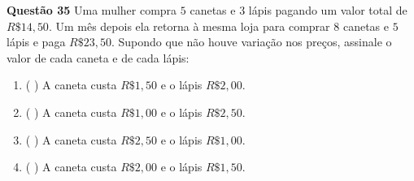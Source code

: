 {\bf Questão 35} 
Uma mulher compra $5$ canetas e $3$ lápis pagando um valor total de $R\$ 14,50$. Um mês depois ela retorna à
mesma loja para comprar $8$ canetas e $5$ lápis e paga $R\$ 23,50$. Supondo que não houve variação nos preços,
assinale o valor de cada caneta e de cada lápis:
\begin{enumerate}
		\item ( ) A caneta custa $R\$ 1,50$ e o lápis $R\$ 2,00$.
		\item ( ) A caneta custa $R\$ 1,00$ e o lápis $R\$ 2,50$.
		\item ( ) A caneta custa $R\$ 2,50$ e o lápis $R\$ 1,00$.
		\item ( ) A caneta custa $R\$ 2,00$ e o lápis $R\$ 1,50$.
\end{enumerate}
